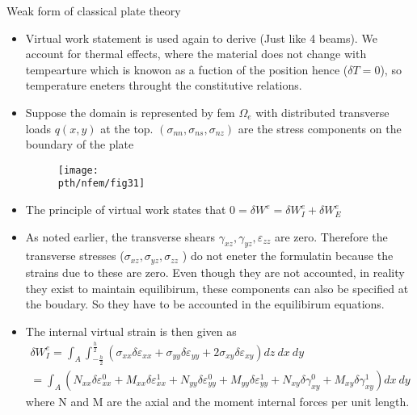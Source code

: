 	\begin{frame}{Weak form of classical plate theory}
		\begin{itemize}
			\item Virtual work statement is used again to derive (Just like 4 beams). We account for thermal effects, where the material does not change with tempearture which is knowon as a fuction of the position  hence ($\delta T = 0$), so temperature eneters throught the constitutive relations.
			\item Suppose the domain is represented by fem $\Omega_e$ with  distributed transverse loads $q(x,y)$ at the top. $(\sigma_{nn},\sigma_{ns},\sigma_{nz})$ are the stress components on the boundary of the plate
			\begin{figure}
				\centering
				\texttt{[image: \\pth/nfem/fig31]} 		
			\end{figure}
		\end{itemize}
	\end{frame}


	\begin{frame}
		\begin{itemize}
			\item The principle of virtual work states that $0 = \delta W^e = \delta W_I^e + \delta W_E^e$
			\item As noted earlier, the transverse shears $\gamma_{xz},\gamma_{yz},\varepsilon_{zz}$ are zero. Therefore the transverse stresses ($\sigma_{xz},\sigma_{yz},\sigma_{zz}$ ) do not eneter the formulatin because the strains due to these are zero. Even though they are not accounted, in reality they exist to maintain equilibirum, these components can also be specified at the boudary. So they have to be accounted in the equilibirum equations. 
			\item The internal virtual strain is then given as 
			\begin{equation}
				\begin{aligned}
					\delta W_I^e = \int_A \int_{-\frac{h}{2}}^{\frac{h}{2}} 
					\left(
					\sigma_{xx} \delta \varepsilon_{xx} + \sigma_{yy} \delta \varepsilon_{yy} + 2\sigma_{xy} \delta \varepsilon_{xy}
					\right) dz~dx~dy\\
					= \int_A \left(N_{xx}\delta \varepsilon_{xx}^0 + M_{xx}\delta\varepsilon_{xx}^1 + N_{yy}\delta\varepsilon_{yy}^0 + M_{yy}\delta\varepsilon_{yy}^1 
					 + N_{xy}\delta\gamma_{xy}^0 + M_{xy}\delta\gamma_{xy}^1 \right) dx~dy
				\end{aligned}
			\end{equation}
			where N and M are the axial and the moment internal forces per unit length. 
		\end{itemize}
	\end{frame}


